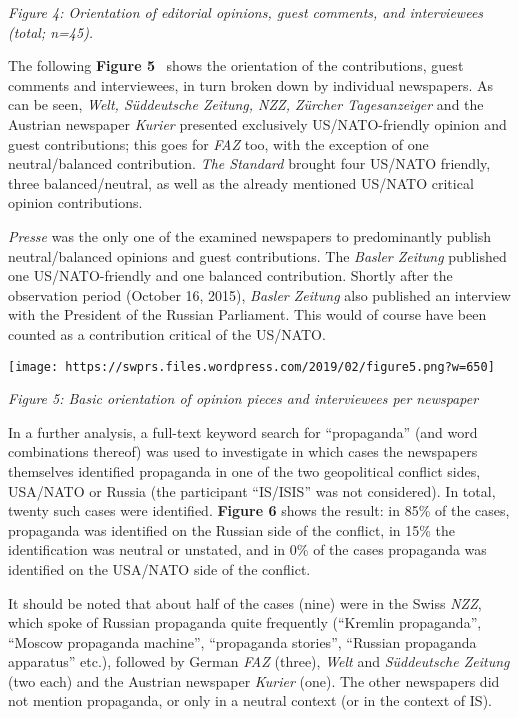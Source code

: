 \emph{Figure 4: Orientation of editorial opinions, guest comments, and
interviewees (total; n=45).}

The following \textbf{Figure 5}~ shows the orientation of the
contributions, guest comments and interviewees, in turn broken down by
individual newspapers. As can be seen, \emph{Welt, Süddeutsche Zeitung,
NZZ, Zürcher Tagesanzeiger} and the Austrian newspaper \emph{Kurier}
presented exclusively US/NATO-friendly opinion and guest contributions;
this goes for \emph{FAZ} too, with the exception of one neutral/balanced
contribution. \emph{The Standard} brought four US/NATO friendly, three
balanced/neutral, as well as the already mentioned US/NATO critical
opinion contributions.

\emph{Presse} was the only one of the examined newspapers to
predominantly publish neutral/balanced opinions and guest contributions.
The \emph{Basler Zeitung} published one US/NATO-friendly and one
balanced contribution. Shortly after the observation period (October 16,
2015), \emph{Basler Zeitung} also published an interview with the
President of the Russian Parliament. This would of course have been
counted as a contribution critical of the US/NATO.

\texttt{[image: https://swprs.files.wordpress.com/2019/02/figure5.png?w=650]}

\emph{Figure 5: Basic orientation of opinion pieces and interviewees per
newspaper}

In a further analysis, a full-text keyword search for ``propaganda''
(and word combinations thereof) was used to investigate in which cases
the newspapers themselves identified propaganda in one of the two
geopolitical conflict sides, USA/NATO or Russia (the participant
``IS/ISIS'' was not considered). In total, twenty such cases were
identified. \textbf{Figure 6} shows the result: in 85\% of the cases,
propaganda was identified on the Russian side of the conflict, in 15\%
the identification was neutral or unstated, and in 0\% of the cases
propaganda was identified on the USA/NATO side of the conflict.

It should be noted that about half of the cases (nine) were in the Swiss
\emph{NZZ}, which spoke of Russian propaganda quite frequently
(``Kremlin propaganda'', ``Moscow propaganda machine'', ``propaganda
stories'', ``Russian propaganda apparatus'' etc.), followed by German
\emph{FAZ} (three), \emph{Welt} and \emph{Süddeutsche Zeitung} (two
each) and the Austrian newspaper \emph{Kurier} (one). The other
newspapers did not mention propaganda, or only in a neutral context (or
in the context of IS).

